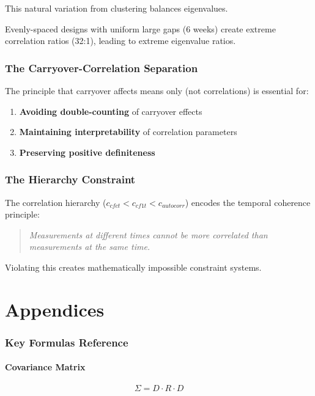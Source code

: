 \documentclass[11pt]{article}
\theoremstyle{definition}
\begin{document}
This natural variation from clustering balances eigenvalues.

Evenly-spaced designs with uniform large gaps (6 weeks) create extreme
correlation ratios (32:1), leading to extreme eigenvalue ratios.

\section{The Carryover-Correlation Separation}

The principle that carryover affects means only (not correlations) is
essential for:
\begin{enumerate}
    \item \textbf{Avoiding double-counting} of carryover effects
    \item \textbf{Maintaining interpretability} of correlation parameters
    \item \textbf{Preserving positive definiteness}
\end{enumerate}

\section{The Hierarchy Constraint}

The correlation hierarchy ($c_{cfct} < c_{cf1t} < c_{autocorr}$) encodes
the temporal coherence principle:

\begin{quote}
\textit{Measurements at different times cannot be more correlated than
measurements at the same time.}
\end{quote}

Violating this creates mathematically impossible constraint systems.

\appendix
\part*{Appendices}

\section{Key Formulas Reference}

\subsection{Covariance Matrix}
\begin{equation}
\Sigma = D \cdot R \cdot D
\end{equation}
\end{document}
